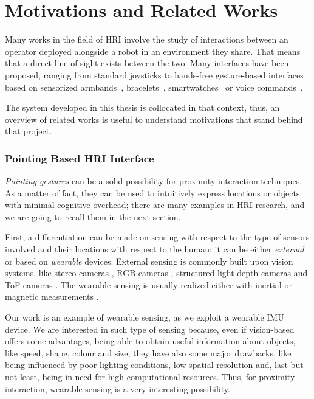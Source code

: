 \section*{Motivations and Related Works} \label{sec:related}
Many works in the field of \ac{HRI} involve the study of interactions between an operator deployed alongside a robot in an environment they share. That means that a direct line of sight exists between the two. Many interfaces have been proposed, ranging from standard joysticks to hands-free gesture-based interfaces based on sensorized armbands~\cite{Wolf2013}, bracelets~\cite{Cacace2016,gromov2018video}, smartwatches~\cite{Villani2017} or voice commands~\cite{Gromov2016}.

The system developed in this thesis is collocated in that context, thus, an overview of related works is useful to understand motivations that stand behind that project.

\subsubsection*{Pointing Based HRI Interface}
\emph{Pointing gestures} can be a solid possibility for proximity interaction techniques.
As a matter of fact, they can be used to intuitively express locations or objects with minimal cognitive overhead; there are many examples in \ac{HRI} research, and we are going to recall them in the next section.

First, a differentiation can be made on sensing with respect to the type of sensors involved and their locations with respect to the human: it can be either \emph{external} or based on \emph{wearable} devices.
External sensing is commonly built upon vision systems, like stereo cameras \cite{Nickel2003}, \acs{RGB} cameras \cite{Pateraki2014,Monajjemi2016},  structured light depth cameras \cite{Cosgun2015} and \ac{ToF} cameras \cite{Droeschel2011}. The wearable sensing is usually realized either with inertial \cite{Wolf2013,Sugiyama2013} or magnetic measurements \cite{Bolt1980,Nickel2003}. 

Our work is an example of wearable sensing, as we exploit a wearable \ac{IMU} device. We are interested in such type of sensing because, even if vision-based offers some advantages, being able to obtain useful information about objects, like speed, shape, colour and size, they have also some major drawbacks, like being influenced by poor lighting conditions, low spatial resolution and, last but not least, being in need for high computational resources.
Thus, for proximity interaction, wearable sensing is a very interesting possibility.

